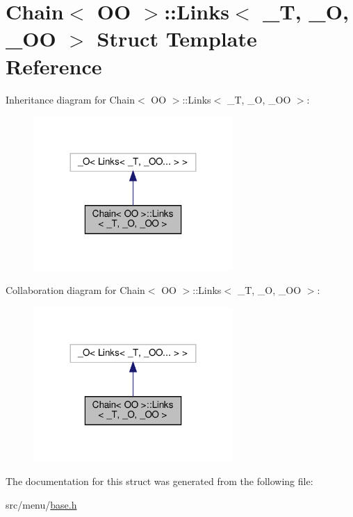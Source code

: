 \hypertarget{structChain_1_1Links}{}\section{Chain$<$ OO $>$\+:\+:Links$<$ \+\_\+T, \+\_\+O, \+\_\+\+OO $>$ Struct Template Reference}
\label{structChain_1_1Links}


Inheritance diagram for Chain$<$ OO $>$\+:\+:Links$<$ \+\_\+T, \+\_\+O, \+\_\+\+OO $>$\+:\nopagebreak
\begin{figure}[H]
\begin{center}
\leavevmode
\includegraphics[width=215pt]{structChain_1_1Links__inherit__graph}
\end{center}
\end{figure}


Collaboration diagram for Chain$<$ OO $>$\+:\+:Links$<$ \+\_\+T, \+\_\+O, \+\_\+\+OO $>$\+:\nopagebreak
\begin{figure}[H]
\begin{center}
\leavevmode
\includegraphics[width=215pt]{structChain_1_1Links__coll__graph}
\end{center}
\end{figure}


The documentation for this struct was generated from the following file\+:\begin{DoxyCompactItemize}
\item 
src/menu/\hyperlink{base_8h}{base.\+h}\end{DoxyCompactItemize}
